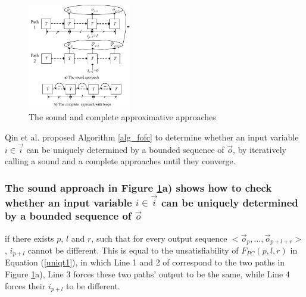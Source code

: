 \documentclass[conference]{IEEEtran}
\begin{document}
\begin{figure}[t]
\begin{center}
\includegraphics[width=0.4\textwidth]{pc}
\end{center}
\caption{The sound and complete approximative approaches}
  \label{fig_pc}
\end{figure}

Qin et al. \cite{QinTODAES15} proposed Algorithm \ref{alg_fofc}
to determine whether an input variable $i\in\vec{i}$ can be uniquely determined by a bounded sequence of $\vec{o}$,
by iteratively calling 
a sound and a complete approaches until they converge.

\subsubsection{The sound approach in Figure \ref{fig_pc}a) shows how to check whether
an input variable $i\in\vec{i}$ can be uniquely determined by a bounded sequence of $\vec{o}$}\label{subsub_sound}
if there exists $p$, $l$ and $r$,
such that for every output sequence $<\vec{o}_p,\dots,\vec{o}_{p+l+r}>$,
$i_{p+l}$ cannot be different.
This is equal to the unsatisfiability of $F_{PC}(p,l,r)$ in Equation (\ref{uniqt1}),
in which Line 1 and 2 of correspond to the two paths in Figure \ref{fig_pc}a),
Line 3 forces these two paths' output to be the same,
while Line 4 forces their $i_{p+l}$ to be different.
\end{document}
